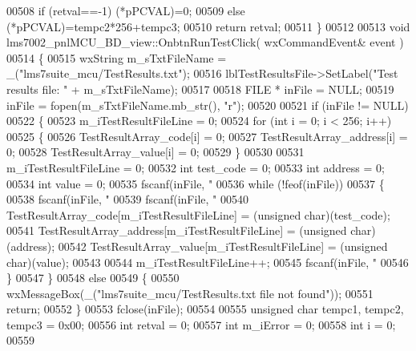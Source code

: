 \begin{DoxyCode}
{{{{{{{00508     \textcolor{keywordflow}{if} (retval==-1) (*pPCVAL)=0;
00509     \textcolor{keywordflow}{else} (*pPCVAL)=tempc2*256+tempc3;
00510     \textcolor{keywordflow}{return} retval;
00511 \}
00512 
00513 \textcolor{keywordtype}{void} lms7002_pnlMCU_BD_view::OnbtnRunTestClick( wxCommandEvent& event )
00514 \{
00515     wxString m\_sTxtFileName = \_(\textcolor{stringliteral}{"lms7suite\_mcu/TestResults.txt"});
00516     lblTestResultsFile->SetLabel(\textcolor{stringliteral}{"Test results file: "} + m\_sTxtFileName);
00517 
00518     FILE * inFile = NULL;
00519     inFile = fopen(m\_sTxtFileName.mb\_str(), \textcolor{stringliteral}{"r"});
00520 
00521     \textcolor{keywordflow}{if} (inFile != NULL)
00522     \{
00523         m_iTestResultFileLine = 0;
00524         \textcolor{keywordflow}{for} (\textcolor{keywordtype}{int} i = 0; i < 256; i++)
00525         \{
00526             TestResultArray_code[i] = 0;
00527             TestResultArray_address[i] = 0;
00528             TestResultArray_value[i] = 0;
00529         \}
00530 
00531         m_iTestResultFileLine = 0;
00532         \textcolor{keywordtype}{int}  test\_code = 0;
00533         \textcolor{keywordtype}{int}  address = 0;
00534         \textcolor{keywordtype}{int}  value = 0;
00535         fscanf(inFile, \textcolor{stringliteral}{"%
00536         \textcolor{keywordflow}{while} (!feof(inFile))
00537         \{
00538             fscanf(inFile, \textcolor{stringliteral}{"%
00539             fscanf(inFile, \textcolor{stringliteral}{"%
00540             TestResultArray_code[m_iTestResultFileLine] = (\textcolor{keywordtype}{unsigned} char)(test\_code);
00541             TestResultArray_address[m_iTestResultFileLine] = (\textcolor{keywordtype}{unsigned} char)(address);
00542             TestResultArray_value[m_iTestResultFileLine] = (\textcolor{keywordtype}{unsigned} char)(value);
00543 
00544             m_iTestResultFileLine++;
00545             fscanf(inFile, \textcolor{stringliteral}{"%
00546         \}
00547     \}
00548     \textcolor{keywordflow}{else}
00549     \{
00550         wxMessageBox(\_(\textcolor{stringliteral}{"lms7suite\_mcu/TestResults.txt file not found"}));
00551         \textcolor{keywordflow}{return};
00552     \}
00553     fclose(inFile);
00554 
00555     \textcolor{keywordtype}{unsigned} \textcolor{keywordtype}{char} tempc1, tempc2, tempc3 = 0x00;
00556     \textcolor{keywordtype}{int} retval = 0;
00557     \textcolor{keywordtype}{int} m\_iError = 0;
00558     \textcolor{keywordtype}{int} i = 0;
00559 
}}}}}}}}}}}
\end{DoxyCode}
